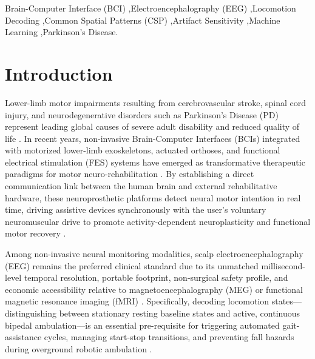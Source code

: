 \documentclass[review,12pt]{elsarticle}
\begin{document}
\begin{frontmatter}
\begin{keyword}
Brain-Computer Interface (BCI) \sep Electroencephalography (EEG) \sep Locomotion Decoding \sep Common Spatial Patterns (CSP) \sep Artifact Sensitivity \sep Machine Learning \sep Parkinson's Disease.
\end{keyword}

\end{frontmatter}

\linenumbers

\section{Introduction}
\label{sec:introduction}

Lower-limb motor impairments resulting from cerebrovascular stroke, spinal cord injury, and neurodegenerative disorders such as Parkinson's Disease (PD) represent leading global causes of severe adult disability and reduced quality of life \cite{who2022disability}. In recent years, non-invasive Brain-Computer Interfaces (BCIs) integrated with motorized lower-limb exoskeletons, actuated orthoses, and functional electrical stimulation (FES) systems have emerged as transformative therapeutic paradigms for motor neuro-rehabilitation \cite{pfurtscheller2006bci, cheri2020exoskeleton}. By establishing a direct communication link between the human brain and external rehabilitative hardware, these neuroprosthetic platforms detect neural motor intention in real time, driving assistive devices synchronously with the user's voluntary neuromuscular drive to promote activity-dependent neuroplasticity and functional motor recovery \cite{soekadar2015bci, leamy2021robotic}.

Among non-invasive neural monitoring modalities, scalp electroencephalography (EEG) remains the preferred clinical standard due to its unmatched millisecond-level temporal resolution, portable footprint, non-surgical safety profile, and economic accessibility relative to magnetoencephalography (MEG) or functional magnetic resonance imaging (fMRI) \cite{niederhauser2021wearable}. Specifically, decoding locomotion states---distinguishing between stationary resting baseline states and active, continuous bipedal ambulation---is an essential pre-requisite for triggering automated gait-assistance cycles, managing start-stop transitions, and preventing fall hazards during overground robotic ambulation \cite{luu2017gait, kline2015locomotion}.
\end{document}
